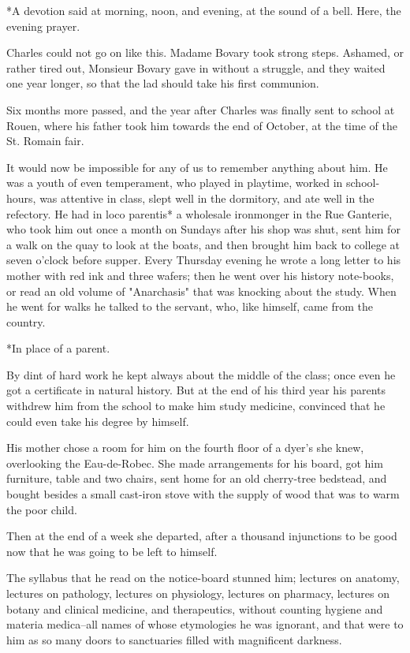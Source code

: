 \documentclass{tufte-book}
\begin{document}
     *A devotion said at morning, noon, and evening, at the sound
     of a bell. Here, the evening prayer.

Charles could not go on like this. Madame Bovary took strong steps.
Ashamed, or rather tired out, Monsieur Bovary gave in without a
struggle, and they waited one year longer, so that the lad should take
his first communion.

Six months more passed, and the year after Charles was finally sent to
school at Rouen, where his father took him towards the end of October,
at the time of the St. Romain fair.

It would now be impossible for any of us to remember anything about him.
He was a youth of even temperament, who played in playtime, worked in
school-hours, was attentive in class, slept well in the dormitory,
and ate well in the refectory. He had in loco parentis* a wholesale
ironmonger in the Rue Ganterie, who took him out once a month on Sundays
after his shop was shut, sent him for a walk on the quay to look at
the boats, and then brought him back to college at seven o'clock before
supper. Every Thursday evening he wrote a long letter to his mother with
red ink and three wafers; then he went over his history note-books, or
read an old volume of "Anarchasis" that was knocking about the study.
When he went for walks he talked to the servant, who, like himself, came
from the country.

     *In place of a parent.

By dint of hard work he kept always about the middle of the class; once
even he got a certificate in natural history. But at the end of his
third year his parents withdrew him from the school to make him study
medicine, convinced that he could even take his degree by himself.

His mother chose a room for him on the fourth floor of a dyer's she
knew, overlooking the Eau-de-Robec. She made arrangements for his
board, got him furniture, table and two chairs, sent home for an old
cherry-tree bedstead, and bought besides a small cast-iron stove with
the supply of wood that was to warm the poor child.

Then at the end of a week she departed, after a thousand injunctions to
be good now that he was going to be left to himself.

The syllabus that he read on the notice-board stunned him; lectures
on anatomy, lectures on pathology, lectures on physiology, lectures on
pharmacy, lectures on botany and clinical medicine, and therapeutics,
without counting hygiene and materia medica--all names of whose
etymologies he was ignorant, and that were to him as so many doors to
sanctuaries filled with magnificent darkness.
\end{document}
